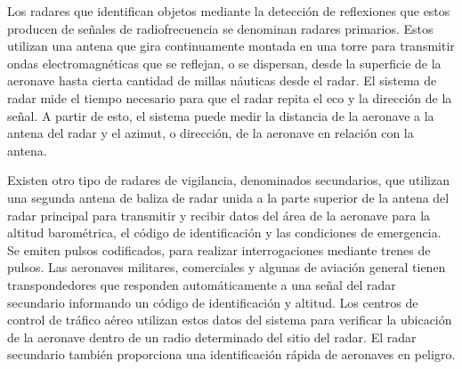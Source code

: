 Los radares que identifican objetos mediante la detección de reflexiones que estos producen de señales de radiofrecuencia se denominan radares primarios. Estos utilizan una antena que gira continuamente montada en una torre para transmitir ondas electromagnéticas que se reflejan, o se dispersan, desde la superficie de la aeronave hasta cierta cantidad de millas náuticas desde el radar. El sistema de radar mide el tiempo necesario para que el radar repita el eco y la dirección de la señal. A partir de esto, el sistema puede medir la distancia de la aeronave a la antena del radar y el azimut, o dirección, de la aeronave en relación con la antena.

Existen otro tipo de radares de vigilancia, denominados secundarios, que utilizan una segunda antena de baliza de radar unida a la parte superior de la antena del radar principal para transmitir y recibir datos del área de la aeronave para la altitud barométrica, el código de identificación y las condiciones de emergencia. Se emiten pulsos codificados, para realizar interrogaciones mediante trenes de pulsos. Las aeronaves militares, comerciales y algunas de aviación general tienen transpondedores que responden automáticamente a una señal del radar secundario informando un código de identificación y altitud. Los centros de control de tráfico aéreo utilizan estos datos del sistema para verificar la ubicación de la aeronave dentro de un radio determinado del sitio del radar. El radar secundario también proporciona una identificación rápida de aeronaves en peligro.


